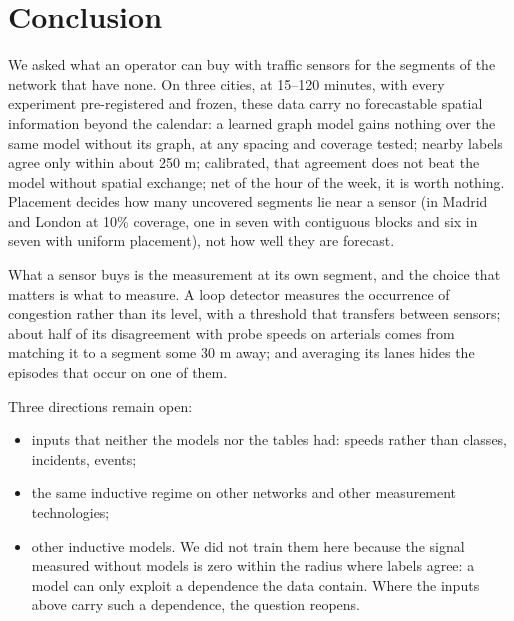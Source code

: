 \section{Conclusion}
We asked what an operator can buy with traffic sensors for the segments of the network that have none. On three cities, at 15–120 minutes, with every experiment pre-registered and frozen, these data carry no forecastable spatial information beyond the calendar: a learned graph model gains nothing over the same model without its graph, at any spacing and coverage tested; nearby labels agree only within about 250 m; calibrated, that agreement does not beat the model without spatial exchange; net of the hour of the week, it is worth nothing. Placement decides how many uncovered segments lie near a sensor (in Madrid and London at 10\% coverage, one in seven with contiguous blocks and six in seven with uniform placement), not how well they are forecast.

What a sensor buys is the measurement at its own segment, and the choice that matters is what to measure. A loop detector measures the occurrence of congestion rather than its level, with a threshold that transfers between sensors; about half of its disagreement with probe speeds on arterials comes from matching it to a segment some 30 m away; and averaging its lanes hides the episodes that occur on one of them.

Three directions remain open:

\begin{itemize}
\item inputs that neither the models nor the tables had: speeds rather than classes, incidents, events;
\item the same inductive regime on other networks and other measurement technologies;
\item other inductive models. We did not train them here because the signal measured without models is zero within the radius where labels agree: a model can only exploit a dependence the data contain. Where the inputs above carry such a dependence, the question reopens.
\end{itemize}

